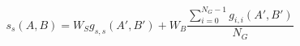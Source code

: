 \begin{equation}
s_s(A,B) = W_S g_{s,s}(A',B') + W_B \frac{\sum_{i=0}^{N_G-1} g_{i,i}(A',B')}{N_G}
\label{eq:song_distance_sorted}
\end{equation}
